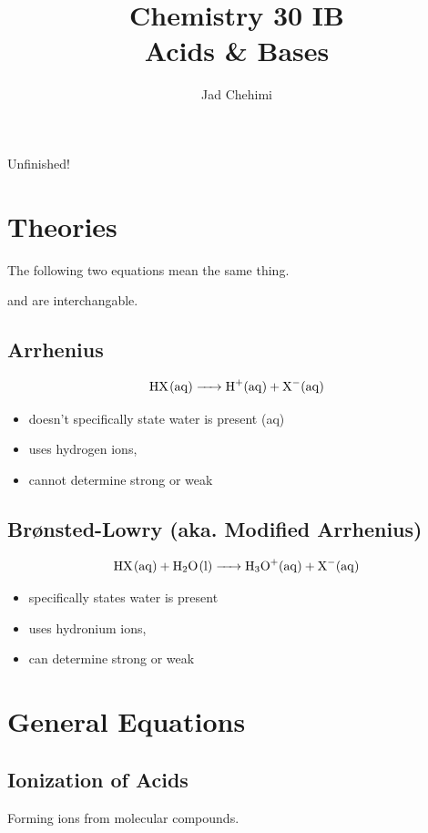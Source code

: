 \documentclass[a4paper,12pt]{article}
\title{Chemistry 30 IB \\ Acids \& Bases}
\author{Jad Chehimi}
\begin{document}
\maketitle

\begin{center}
\Huge
Unfinished!
\normalsize
\end{center}

\tableofcontents

\pagebreak

\section{Theories}
The following two equations mean the same thing.

 and  are interchangable.

\subsection{Arrhenius}
\Large
$$\ce{HX(aq) -> H+(aq) + X-(aq)}$$
\normalsize
\begin{itemize}
    \item{doesn't specifically state water is present (aq)}
    \item{uses hydrogen ions, }
    \item{cannot determine strong or weak}
\end{itemize}

\subsection{Br{\o}nsted-Lowry (aka. Modified Arrhenius)}
\Large
$$\ce{HX(aq) + H2O(l) -> H3O+(aq) + X-(aq)}$$
\normalsize
\begin{itemize}
    \item{specifically states water is present}
    \item{uses hydronium ions, }
    \item{can determine strong or weak}
\end{itemize}

\section{General Equations}

\subsection{Ionization of Acids}
Forming ions from molecular compounds.
\end{document}

